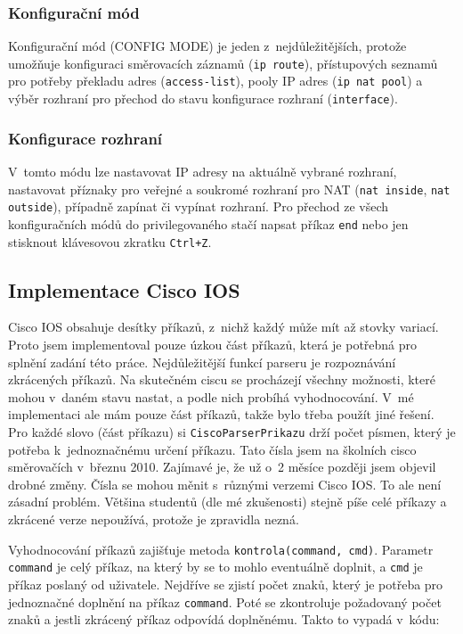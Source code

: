 \subsubsection{Konfigurační mód}
Konfigurační mód (CONFIG MODE) je jeden z~nejdůležitějších, protože umožňuje konfiguraci směrovacích záznamů (\verb|ip route|), přístupových seznamů pro potřeby překladu adres (\verb|access-list|), pooly IP adres (\verb|ip nat pool|) a výběr rozhraní pro přechod do stavu konfigurace rozhraní (\verb|interface|).

\subsubsection{Konfigurace rozhraní} \label{configif}
V~tomto módu lze nastavovat IP adresy na aktuálně vybrané rozhraní, nastavovat příznaky pro veřejné a soukromé rozhraní pro NAT (\verb|nat inside|, \verb|nat outside|), případně zapínat či vypínat rozhraní. Pro přechod ze všech konfiguračních módů do privilegovaného stačí napsat příkaz \verb|end| nebo jen stisknout klávesovou zkratku \verb|Ctrl+Z|.


\subsection{Implementace Cisco IOS}
Cisco IOS obsahuje desítky příkazů, z~nichž každý může mít až stovky variací. Proto jsem implementoval pouze úzkou část příkazů, která je potřebná pro splnění zadání této práce. Nejdůležitější funkcí parseru je rozpoznávání zkrácených příkazů. Na skutečném ciscu se procházejí všechny možnosti, které mohou v~daném stavu nastat, a podle nich probíhá vyhodnocování. V~mé implementaci ale mám pouze část příkazů, takže bylo třeba použít jiné řešení. Pro každé slovo (část příkazu) si \verb|CiscoParserPrikazu| drží počet písmen, který je potřeba k~jednoznačnému určení příkazu. Tato čísla jsem  na školních cisco směrovačích v~březnu 2010. Zajímavé je, že už o~2 měsíce později jsem objevil drobné změny. Čísla se mohou měnit s~různými verzemi Cisco IOS. To ale není zásadní problém. Většina studentů (dle mé zkušenosti) stejně píše celé příkazy a zkrácené verze nepoužívá, protože je zpravidla nezná.

Vyhodnocování příkazů zajišťuje metoda \verb|kontrola(command, cmd)|. Parametr \verb|command| je celý příkaz, na který by se to mohlo eventuálně doplnit, a \verb|cmd| je příkaz poslaný od uživatele. Nejdříve se zjistí počet znaků, který je potřeba pro jednoznačné doplnění na příkaz \verb|command|. Poté se zkontroluje požadovaný počet znaků a jestli zkrácený příkaz odpovídá doplněnému. Takto to vypadá v~kódu:

